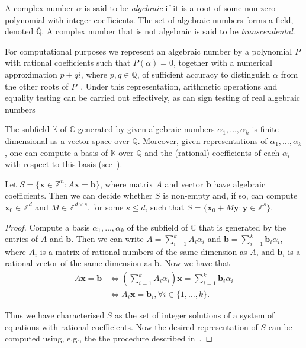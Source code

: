 \documentclass[format=acmsmall, review=false, screen=true]{acmart}
\newcommand{\Rationals}{\mathbb{Q}}
\newcommand{\Algebraics}{\overline{\Rationals}}
\newcommand{\Integers}{\mathbb{Z}}
\newcommand{\myvector}{\boldsymbol}
\begin{document}
A complex number $\alpha$ is said to be \emph{algebraic} if it is a
root of some non-zero polynomial with integer coefficients.  The set
of algebraic numbers forms a field, denoted $\Algebraics$. A complex
number that is not algebraic is said to be \emph{transcendental}.

For computational purposes we represent an algebraic number by a
polynomial $P$ with rational coefficients such that $P(\alpha)=0$,
together with a numerical approximation $p+qi$, where
$p,q\in \mathbb{Q}$, of sufficient accuracy to distinguish $\alpha$
from the other roots of $P$~\cite[Section 4.2.1]{Cohen}.  Under this
representation, arithmetic operations and equality testing can be
carried out effectively, as can sign testing of real algebraic numbers

The subfield $\mathbb{K}$ of $\mathbb{C}$ generated by given algebraic
numbers $\alpha_1,\ldots,\alpha_k$ is finite dimensional as a vector
space over $\mathbb{Q}$.  Moreover, given representations of
$\alpha_1,\ldots,\alpha_k$, one can compute a basis of $\mathbb{K}$
over $\mathbb{Q}$ and the (rational) coefficients of each $\alpha_i$
with respect to this basis (see~\cite[Section 4.5]{Cohen}).

\begin{proposition}
    \label{prop:alg_eqn} Let $S=\{ \myvector{x} \in \mathbb{Z}^n :
A\myvector{x}=\myvector{b} \}$, where matrix $A$ and vector
$\myvector{b}$ have algebraic coefficients.  Then we can decide
whether $S$ is non-empty and, if so, can compute
$\myvector{x}_0 \in \mathbb{Z}^d$ and $M \in \mathbb{Z}^{d\times s}$,
for some $s\leq d$, such that $S = \lbrace \myvector{x}_{0} + M \myvector{y}
: \myvector{y} \in \Integers^s \rbrace$.
\end{proposition}

\begin{proof}
Compute a basis $\alpha_1,\ldots,\alpha_k$ of the subfield of
  $\mathbb{C}$ that is generated by the entries of $A$ and
  $\myvector{b}$.  Then we can write $A = \sum_{i=1}^k A_i \alpha_i$
  and $\myvector{b}= \sum_{i=1}^k \myvector{b}_i\alpha_i$, where $A_i$ is a
  matrix of rational numbers of the same dimension as $A$, and
  $\myvector{b}_i$ is a rational vector of the same dimension as
  $\myvector{b}$.  Now we have that
\begin{align*}
A \myvector{x} = \myvector{b} &\Leftrightarrow \left( \sum \limits_{i=1}^{k} A_{i} \alpha_i  \right) \myvector{x} = \sum \limits_{i=1}^{k} \myvector{b}_{i} \alpha_{i} \\
&\Leftrightarrow A_{i} \myvector{x} = \myvector{b}_{i}, \forall i \in \lbrace 1, \ldots, k \rbrace .
\end{align*}

Thus we have characterised $S$ as the set of integer solutions of a
system of equations with rational coefficients.  Now the desired
representation of $S$ can be computed using, e.g., the the procedure
described in~\cite[Chapter X]{Cohen}.
\end{proof}
\end{document}
